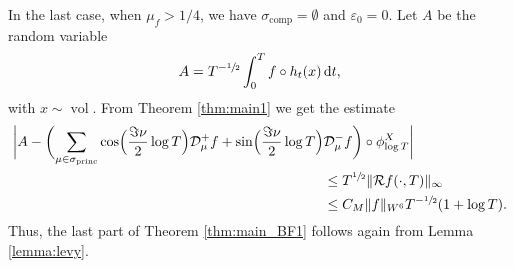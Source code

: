 \documentclass[11pt]{article}
\newcommand*{\diff}{\mathop{}\!\mathrm{d}}
\newcommand{\Dp}[1]{\mathcal{D}_\mu^{+} #1}
\newcommand{\Dm}[1]{\mathcal{D}_\mu^{-} #1}
\DeclareMathOperator{\vol}{vol}
\DeclareMathOperator{\comp}{comp}
\DeclareMathOperator{\princ}{princ}
\theoremstyle{definition}
\begin{document}
In the last case, when $\mu_f > 1/4$, we have $\sigma_{\comp} = \emptyset$ and $\varepsilon_0=0$.
Let $A$ be the random variable
\[
A = T^{-\sfrac{1}{2}} \int_0^T f \circ h_t(x) \diff t,
\]
with $x \sim \vol$.
From Theorem \ref{thm:main1} we get the estimate
\begin{align*}
\biggl\lvert A - \biggl(\sum_{\mu \in \sigma_{\princ}} \cos\Bigl(\frac{\Im\nu}{2} \log T \Bigr) \Dp{ f} + \sin\Bigl(\frac{\Im\nu}{2} \log T \Bigr) &\Dm{ f} \biggr)\circ \phi^X_{\log T} \biggr\rvert\\
&\leq T^{\sfrac{1}{2}} \|\mathcal{R}f(\cdot, T) \|_{\infty} \\
& \leq C_M \|f\|_{W^6} T^{-\sfrac{1}{2}} (1+\log T).
\end{align*}
Thus, the last part of Theorem \ref{thm:main_BF1} follows again from Lemma \ref{lemma:levy}.
\end{document}
